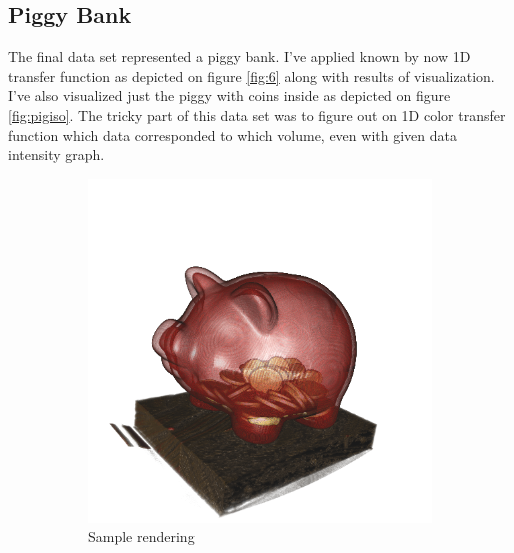\documentclass{article}
\begin{document}
\subsection{Piggy Bank}
The final data set represented a piggy bank. I've applied known by now 1D transfer function as depicted on figure \ref{fig:6} along with results of visualization. I've also visualized just the piggy with coins inside as depicted on figure \ref{fig:pigiso}. The tricky part of this data set was to figure out on 1D color transfer function which data corresponded to which volume, even with given data intensity graph.
\begin{figure}
	\centering
	\begin{subfigure}[h]{0.3\textwidth}
		\includegraphics[width=\textwidth]{pig-1dvolren.png}
		\caption{Sample rendering}
		\label{fig:basepig}
	\end{subfigure}
	\begin{subfigure}[h]{0.3\textwidth}

\end{subfigure}
\end{figure}
\end{document}
